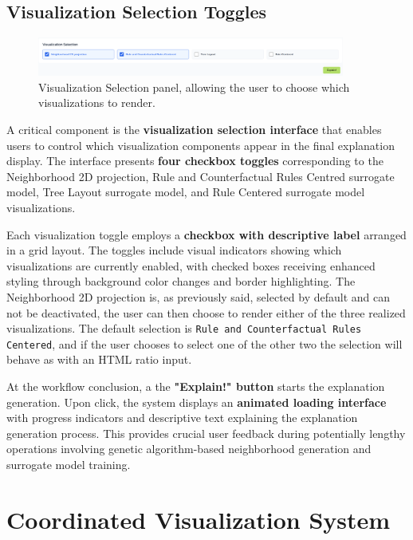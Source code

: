 \subsection{Visualization Selection Toggles}

\begin{figure}[htbp]
  \centering
  \includegraphics[width=0.9\textwidth]{images/Visualization Selection.png}
  \caption{Visualization Selection panel, allowing the user to choose which visualizations to render.}
  \label{fig:Visualization Selection}
\end{figure}

A critical component is the \textbf{visualization selection interface} that enables users to control which visualization components appear in the final explanation display. The interface presents \textbf{four checkbox toggles} corresponding to the Neighborhood 2D projection, Rule and Counterfactual Rules Centred surrogate model, Tree Layout surrogate model, and Rule Centered surrogate model visualizations.

Each visualization toggle employs a \textbf{checkbox with descriptive label} arranged in a grid layout. The toggles include visual indicators showing which visualizations are currently enabled, with checked boxes receiving enhanced styling through background color changes and border highlighting.
The Neighborhood 2D projection is, as previously said, selected by default and can not be deactivated, the user can then choose to render either of the three realized visualizations. The default selection is \texttt{Rule and Counterfactual Rules Centered}, and if the user chooses to select one of the other two the selection will behave as with an HTML ratio input.

At the workflow conclusion, a the \textbf{"Explain!" button} starts the explanation generation. Upon click, the system displays an \textbf{animated loading interface} with progress indicators and descriptive text explaining the explanation generation process. This provides crucial user feedback during potentially lengthy operations involving genetic algorithm-based neighborhood generation and surrogate model training.

\section{Coordinated Visualization System}


